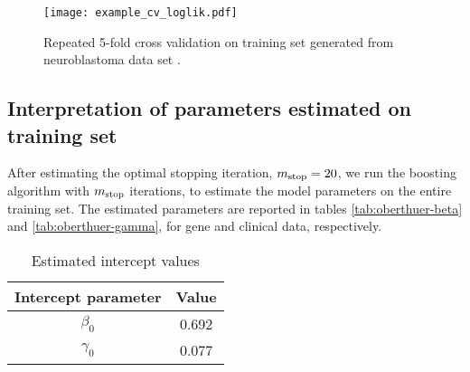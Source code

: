\begin{figure}
\caption{Repeated 5-fold cross validation on training set generated from neuroblastoma data set \citep{oberthuer-data}.}
\label{fig:neuroblastoma-cv}
\centering\texttt{[image: example\_cv\_loglik.pdf]}
\end{figure}

\subsection{Interpretation of parameters estimated on training set}
After estimating the optimal stopping iteration, $m_{\text{stop}}=20$, we run the boosting algorithm with $m_{\text{stop}}$ iterations, to estimate the model parameters on the entire training set.
The estimated parameters are reported in tables \ref{tab:oberthuer-beta} and \ref{tab:oberthuer-gamma}, for gene and clinical data, respectively.
\begin{table}
\caption{Estimated intercept values}
\label{tab:neuroblastoma-intercepts}
\centering
\begin{tabular}{cc}
\toprule
Intercept parameter & Value\\
\hline
$\beta_0$ & 0.692 \\
$\gamma_0$ & 0.077 \\
\bottomrule
\end{tabular}
\end{table}


